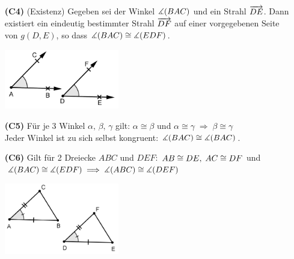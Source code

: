 \begin{enumerate}
    \item[{\bf(C4)}] (Existenz) Gegeben sei der Winkel $\mbox{$\measuredangle$}(BAC)$ und ein Strahl $\mbox{${\overrightarrow{DE}}$}$. Dann
        existiert ein eindeutig bestimmter Strahl $\mbox{${\overrightarrow{DF}}$}$ auf einer vorgegebenen Seite von
        $g(D,E)$, so dass $\mbox{$\measuredangle$}(BAC) \cong \mbox{$\measuredangle$}(EDF)$.

        \centerline{\includegraphics[width=5cm]{BILDER/1-2-08-C4.png}}

    \item[{\bf(C5)}] Für je 3 Winkel $\alpha,\, \beta,\, \gamma$ gilt: $\alpha \cong \beta$ und
        $\alpha \cong \gamma\; \Longrightarrow\; \beta \cong \gamma$\\


        Jeder Winkel ist zu sich selbst kongruent: $\mbox{$\measuredangle$}(BAC) \cong \mbox{$\measuredangle$}(BAC)$.

    \item[{\bf(C6)}] Gilt für 2 Dreiecke $ABC$ und $DEF$: ${AB} \cong {DE},\; {AC} \cong
        {DF}$ und $\mbox{$\measuredangle$}(BAC) \cong \mbox{$\measuredangle$}(EDF)\; \Longrightarrow\; \mbox{$\measuredangle$}(ABC) \cong \mbox{$\measuredangle$}(DEF)$


    \centerline{\includegraphics[width=5cm]{BILDER/1-2-08-C6.png}}
\end{enumerate}


